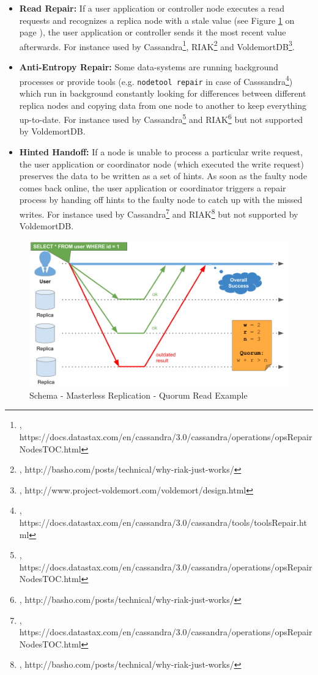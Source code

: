 {\begin{itemize}
\item \textbf{Read Repair:} If a user application or controller node executes a read requests and recognizes a replica node with a stale value (see Figure \ref{replication_schema_ll_quorum_read} on page \pageref{replication_schema_ll_quorum_read}), the user application or controller sends it the most recent value afterwards. For instance used by Cassandra\footnote{\cite{CASSRN}, https://docs.datastax.com/en/cassandra/3.0/cassandra/operations/opsRepairNodesTOC.html}, RIAK\footnote{\cite{RIAKRN}, http://basho.com/posts/technical/why-riak-just-works/} and VoldemortDB\footnote{\cite{VOLDML}, http://www.project-voldemort.com/voldemort/design.html}.
\item \textbf{Anti-Entropy Repair:} Some data-systems are running background processes or provide tools (e.g. \lstinline{nodetool repair} in case of Casssandra\footnote{\cite{CASSNR}, https://docs.datastax.com/en/cassandra/3.0/cassandra/tools/toolsRepair.html}) which run in background constantly looking for differences between different replica nodes and copying data from one node to another to keep everything up-to-date. For instance used by Cassandra\footnote{\cite{CASSRN}, https://docs.datastax.com/en/cassandra/3.0/cassandra/operations/opsRepairNodesTOC.html} and RIAK\footnote{\cite{RIAKRN}, http://basho.com/posts/technical/why-riak-just-works/} but not supported by VoldemortDB.
\item \textbf{Hinted Handoff:} If a node is unable to process a particular write request, the user application or coordinator node (which executed the write request) preserves the data to be written as a set of hints. As soon as the faulty node comes back online, the user application or coordinator triggers a repair process by handing off hints to the faulty node to catch up with the missed writes. For instance used by Cassandra\footnote{\cite{CASSRN}, https://docs.datastax.com/en/cassandra/3.0/cassandra/operations/opsRepairNodesTOC.html} and RIAK\footnote{\cite{RIAKRN}, http://basho.com/posts/technical/why-riak-just-works/} but not supported by VoldemortDB.\\
\end{itemize}

\begin{figure}[h]
	\centering
  \includegraphics[width=1\textwidth]{replication_schema_ll_quorum_read.png}
	\caption{Schema - Masterless Replication - Quorum Read Example}
	\label{replication_schema_ll_quorum_read}
\end{figure}

}
